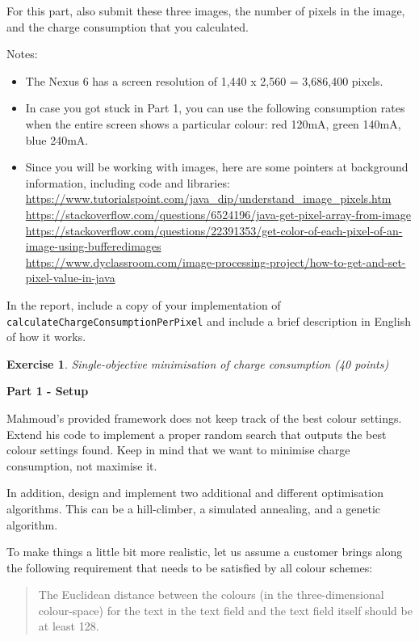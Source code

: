 \documentclass{pracs}
\newtheorem{exercise}{Exercise}
\begin{document}
For this part, also submit these three images, the number of pixels in the image, and the charge consumption that you calculated.

Notes:
\begin{itemize}
\item The Nexus 6 has a screen resolution of 1,440 x 2,560 = 3,686,400 pixels. 
\item In case you got stuck in Part 1, you can use the following consumption rates when the entire screen shows a particular colour: red 120mA, green 140mA, blue 240mA.
\item Since you will be working with images, here are some pointers at background information, including code and libraries: \\
\url{https://www.tutorialspoint.com/java_dip/understand_image_pixels.htm}\\
\url{https://stackoverflow.com/questions/6524196/java-get-pixel-array-from-image}\\
\url{https://stackoverflow.com/questions/22391353/get-color-of-each-pixel-of-an-image-using-bufferedimages}\\
\url{https://www.dyclassroom.com/image-processing-project/how-to-get-and-set-pixel-value-in-java}
\end{itemize}

In the report, include a copy of your implementation of \texttt{calculateChargeConsumptionPerPixel} and include a brief description in English of how it works.




\begin{exercise}
Single-objective minimisation of charge consumption (40 points)
\end{exercise}

\noindent\textbf{Part 1 - Setup}

Mahmoud's provided framework does not keep track of the best colour settings. Extend his code to implement a proper random search that outputs the best colour settings found. Keep in mind that we want to minimise charge consumption, not maximise it. 

In addition, design and implement two additional and different optimisation algorithms. This can be a hill-climber, a simulated annealing, and a genetic algorithm.

To make things a little bit more realistic, let us assume a customer brings along the following requirement that needs to be satisfied by all colour schemes:

\begin{quote}
The Euclidean distance between the colours (in the three-dimensional colour-space) for the text in the text field and the text field itself should be at least 128.
\end{quote}
\end{document}
